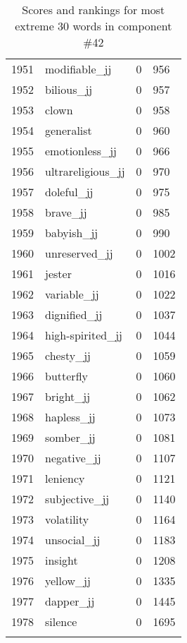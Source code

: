 \begin{longtable}[!htbp]{| rlr@{.}l |}
    1951 & modifiable\_jj & 0 & 956 \\
    1952 & bilious\_jj & 0 & 957 \\
    1953 & clown & 0 & 958 \\
    1954 & generalist & 0 & 960 \\
    1955 & emotionless\_jj & 0 & 966 \\
    1956 & ultrareligious\_jj & 0 & 970 \\
    1957 & doleful\_jj & 0 & 975 \\
    1958 & brave\_jj & 0 & 985 \\
    1959 & babyish\_jj & 0 & 990 \\
    1960 & unreserved\_jj & 0 & 1002 \\
    1961 & jester & 0 & 1016 \\
    1962 & variable\_jj & 0 & 1022 \\
    1963 & dignified\_jj & 0 & 1037 \\
    1964 & high-spirited\_jj & 0 & 1044 \\
    1965 & chesty\_jj & 0 & 1059 \\
    1966 & butterfly & 0 & 1060 \\
    1967 & bright\_jj & 0 & 1062 \\
    1968 & hapless\_jj & 0 & 1073 \\
    1969 & somber\_jj & 0 & 1081 \\
    1970 & negative\_jj & 0 & 1107 \\
    1971 & leniency & 0 & 1121 \\
    1972 & subjective\_jj & 0 & 1140 \\
    1973 & volatility & 0 & 1164 \\
    1974 & unsocial\_jj & 0 & 1183 \\
    1975 & insight & 0 & 1208 \\
    1976 & yellow\_jj & 0 & 1335 \\
    1977 & dapper\_jj & 0 & 1445 \\
    1978 & silence & 0 & 1695 \\
    \hline
    \caption{Scores and rankings for most extreme 30 words in component \#42} \\
\end{longtable}
